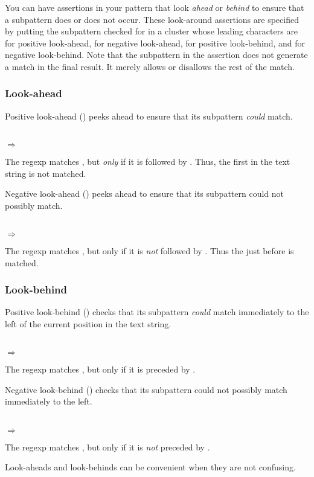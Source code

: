 You can have assertions in your pattern that look {\em ahead} or
\emph{behind} to ensure that a subpattern does or does not occur.
These look-around assertions are specified by putting the subpattern
checked for in a cluster whose leading characters are  for
positive look-ahead,  for negative look-ahead,  for
positive look-behind, and  for negative look-behind.  Note
that the subpattern in the assertion does not generate a match in the
final result.  It merely allows or disallows the rest of the match.

\subsubsection {Look-ahead}

Positive look-ahead () peeks ahead to ensure that its
subpattern \emph{could} match.

 \\
$\Rightarrow$ 

The regexp  matches , but \emph{only}
if it is followed by .  Thus, the first  in the
text string is not matched.

Negative look-ahead () peeks ahead to ensure that its
subpattern could not possibly match.

\\
$\Rightarrow$ 

The regexp  matches , but only if it
is \emph{not} followed by .  Thus the  just
before  is matched.

\subsubsection {Look-behind}

Positive look-behind () checks that its subpattern
\emph{could} match immediately to the left of the current position in
the text string.

 \\
$\Rightarrow$ 

The regexp  matches , but only if it
is preceded by .

Negative look-behind () checks that its subpattern could not
possibly match immediately to the left.

 \\
$\Rightarrow$ 

The regexp  matches , but only if it
is \emph{not} preceded by .

Look-aheads and look-behinds can be convenient when they are not
confusing.
